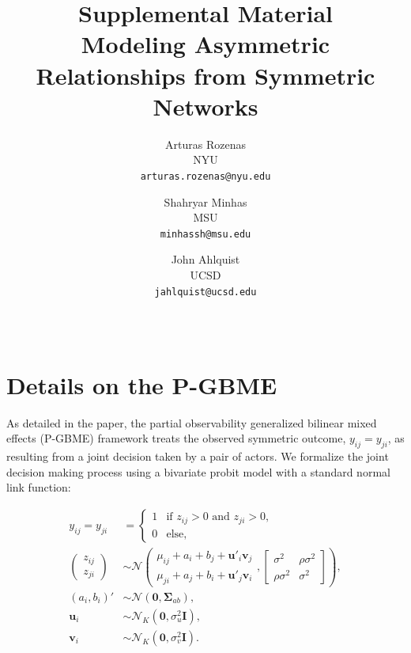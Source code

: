 \documentclass[a4paper, 12pt]{article}
\begin{document}
\title{Supplemental Material \\ {\bf Modeling Asymmetric Relationships from Symmetric Networks}}

\author{
  Arturas Rozenas\\
{\small NYU}\\
  {\small \texttt{arturas.rozenas@nyu.edu}}
\and
  Shahryar Minhas\\
{\small MSU}\\
  {\small \texttt{minhassh@msu.edu}}
\and
 John Ahlquist\\
{\small UCSD}\\
  {\small \texttt{jahlquist@ucsd.edu}}
}

\date{~}
\maketitle

\bigskip

\tableofcontents

\clearpage

\doublespacing
\section{Details on the P-GBME}

As detailed in the paper, the partial observability generalized bilinear mixed effects (P-GBME) framework treats the observed symmetric outcome, $y_{ij} = y_{ji}$, as resulting from a joint decision taken by a pair of actors. We formalize the joint decision making process using a bivariate probit model with a standard normal link function:

\begin{align}
y_{ij} = y_{ji} & =   \left\{ \begin{array}{ll}
         1 & \mbox{if $z_{ij} > 0$ and $z_{ji} > 0$},\\
         0 & \mbox{else},\end{array} \right. \label{mod:y}\\
    \left ( \begin{array}{c}
         z_{ij} \\
         z_{ji} \end{array} \right ) 
         & \sim \mathcal{N}
        \left ( \begin{array}{c}
         \mu_{ij} + a_i + b_j +    \bm{u}'_i\bm{v}_j  \\
         \mu_{ji} + a_j + b_i +  \bm{u}'_j\bm{v}_i \end{array}, \left [ \begin{array}{cc}
        \sigma^2 & \rho \sigma^2 \\
         \rho \sigma^2 & \sigma^2 \end{array} \right] \right ), \label{eq:modz}\\
        (a_i, b_i)' & \sim \mathcal{N}\left(\bm{0}, \bm{\Sigma}_{ab} \right),\\
         \bm{u}_i & \sim \mathcal{N}_K(\bm{0}, \sigma_u^2\bm{I}),\\
         \bm{v}_i & \sim \mathcal{N}_K(\bm{0}, \sigma_v^2\bm{I})\label{eq:modv}.
\end{align}
\end{document}
